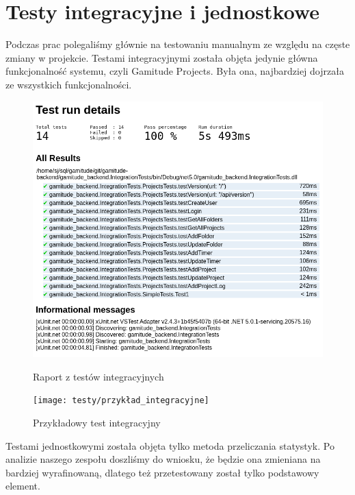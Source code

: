 \documentclass[a4paper,11pt]{report}
\begin{document}
\section{Testy integracyjne i jednostkowe}
Podczas prac polegaliśmy głównie na testowaniu manualnym ze względu na częste zmiany w projekcie.
Testami integracyjnymi została objęta jedynie główna funkcjonalność systemu, czyli Gamitude Projects.
Była ona, najbardziej dojrzała ze wszystkich funkcjonalności.
\begin{figure}[H]
	\centering
	\includegraphics[scale=0.35]{testy/integracyjne}\\
	\caption{Raport z testów integracyjnych}
	\label{fig:integracyjne}
\end{figure}
\begin{figure}[H]
	\centering
	\texttt{[image: testy/przykład\_integracyjne]}\\
	\caption{Przykładowy test integracyjny}
	\label{fig:przykład_integracyjne}
\end{figure}
Testami jednostkowymi została objęta tylko metoda przeliczania statystyk.
Po analizie naszego zespołu doszliśmy do wniosku, że będzie ona zmieniana na bardziej wyrafinowaną, dlatego też przetestowany został tylko podstawowy element.
\end{document}
